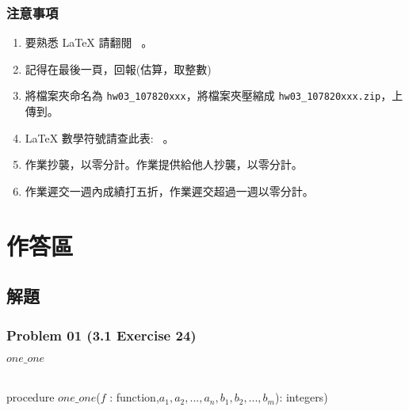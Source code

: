 \documentclass[14pt,hyperref={bookmarks=false}]{beamer}
\begin{document}
	\begin{frame}
	\frametitle{注意事項}
	\fontsize{10}{10pt}\selectfont
	\begin{enumerate}[label=(\alph*)]
	\item 要熟悉 LaTeX 請翻閱 \ 。
	\item 記得在最後一頁，回報\selectfont \color{red}{完成作業小時數}(估算，取整數)\selectfont \color{black}{。}
	\item 將檔案夾命名為 \texttt{hw03\_107820xxx}，將檔案夾壓縮成 \texttt{hw03\_107820xxx.zip}，上傳到。
	\item LaTeX 數學符號請查此表: \ 。
	\item 作業抄襲，以零分計。作業提供給他人抄襲，以零分計。
	\item 作業遲交一週內成績打五折，作業遲交超過一週以零分計。
	\end{enumerate}
	\end{frame}

\section{作答區}

	\subsection{解題}
	
	\begin{frame}
	\frametitle{Problem 01 (3.1 Exercise 24)}
	\fontsize{6}{7pt}\selectfont

\begin{algorithm}[H]
  \scriptsize
\begin{algorithmic}[1]
\ENDFOR
{}
\ELSE
{}
\ENDIF
\ENDFOR
\RETURN $one\_one$
\end{algorithmic}
\caption{\footnotesize \\ procedure $one\_one$($f$ : function,$a_1,a_2,...,a_n,b_1,b_2,...,b_m$): integers)}
\label{alg:seq}
\end{algorithm}

	\end{frame}
	
\end{document}
